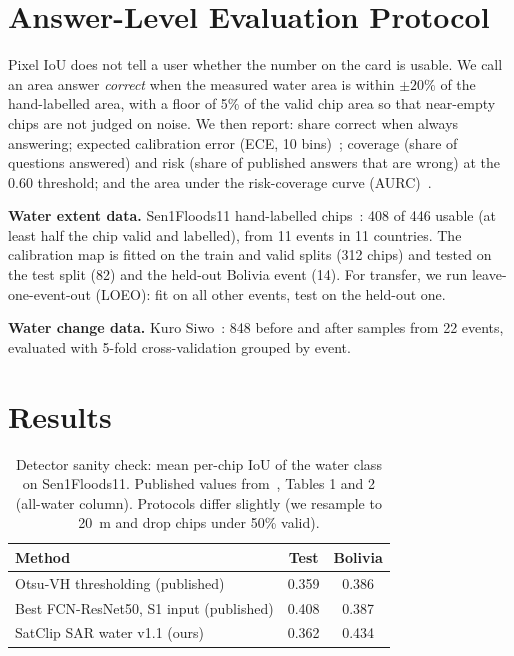 \documentclass[conference]{IEEEtran}
\begin{document}
\section{Answer-Level Evaluation Protocol}
\label{sec:protocol}

Pixel IoU does not tell a user whether the number on the card is usable. We call an area answer \emph{correct} when the measured water area is within $\pm 20\%$ of the hand-labelled area, with a floor of 5\% of the valid chip area so that near-empty chips are not judged on noise. We then report: share correct when always answering; expected calibration error (ECE, 10 bins)~\cite{guo2017calibration}; coverage (share of questions answered) and risk (share of published answers that are wrong) at the 0.60 threshold; and the area under the risk-coverage curve (AURC)~\cite{geifman2017selective}.

\textbf{Water extent data.} Sen1Floods11 hand-labelled chips~\cite{bonafilia2020sen1floods11}: 408 of 446 usable (at least half the chip valid and labelled), from 11 events in 11 countries. The calibration map is fitted on the train and valid splits (312 chips) and tested on the test split (82) and the held-out Bolivia event (14). For transfer, we run leave-one-event-out (LOEO): fit on all other events, test on the held-out one.

\textbf{Water change data.} Kuro Siwo~\cite{bountos2024kurosiwo}: 848 before and after samples from 22 events, evaluated with 5-fold cross-validation grouped by event.

\section{Results}
\label{sec:results}

\begin{table}[t]
\centering
\caption{Detector sanity check: mean per-chip IoU of the water class on Sen1Floods11. Published values from~\cite{bonafilia2020sen1floods11}, Tables 1 and 2 (all-water column). Protocols differ slightly (we resample to 20~m and drop chips under 50\% valid).}
\label{tab:iou}
\begin{tabular}{lcc}
\toprule
Method & Test & Bolivia \\
\midrule
Otsu-VH thresholding (published) & 0.359 & 0.386 \\
Best FCN-ResNet50, S1 input (published) & 0.408 & 0.387 \\
SatClip SAR water v1.1 (ours) & 0.362 & 0.434 \\
\bottomrule
\end{tabular}
\end{table}
\end{document}
